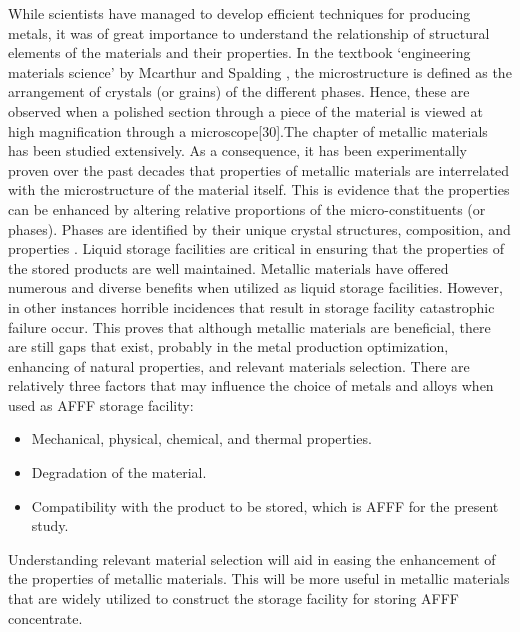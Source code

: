 \documentclass[12pt]{report}
\begin{document}
While scientists have managed to develop efficient techniques for producing metals, it was of great importance to understand the relationship of structural elements of the materials and their properties. In the textbook ‘engineering materials science’ by Mcarthur and Spalding \cite{mcarthur2004engineering}, the microstructure is defined as the arrangement of crystals (or grains) of the different phases. Hence, these are observed when a polished section through a piece of the material is viewed at high magnification through a microscope[30].The chapter of metallic materials has been studied extensively. As a consequence, it has been experimentally proven over the past decades that properties of metallic materials are interrelated with the microstructure of the material itself. This is evidence that the properties can be enhanced by altering relative proportions of the micro-constituents (or phases). Phases are identified by their unique crystal structures, composition, and properties \cite{mcarthur2004engineering}.
Liquid storage facilities are critical in ensuring that the properties of the stored products are well maintained. Metallic materials have offered numerous and diverse benefits when utilized as liquid storage facilities. However, in other instances horrible incidences that result in storage facility catastrophic failure occur. This proves that although metallic materials are beneficial, there are still gaps that exist, probably in the metal production optimization, enhancing of natural properties, and relevant materials selection. There are relatively three factors that may influence the choice of metals and alloys when used as AFFF storage facility:

\begin{itemize}
    \item Mechanical, physical, chemical, and thermal properties.
    \item Degradation of the material.
    \item Compatibility with the product to be stored, which is AFFF for the present study.
\end{itemize}

Understanding relevant material selection will aid in easing the enhancement of the properties of metallic materials. This will be more useful in metallic materials that are widely utilized to construct the storage facility for storing AFFF concentrate. 
\end{document}
